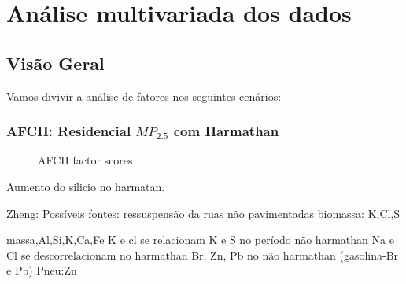 \chapter{Análise multivariada dos dados}

\section{Visão Geral}
Vamos divivir a análise de fatores nos seguintes cenários:



\subsection{AFCH: Residencial $MP_{2.5}$ \textbf{com} Harmathan}

%
%

\begin{figure}[H]
\centering
\caption{AFCH factor scores}
\label{fig:AFCH_factor_scores}
\end{figure}

Aumento do silicio no harmatan.

Zheng: 
Possíveis fontes: ressuspensão da ruas não pavimentadas
biomassa: K,Cl,S

massa,Al,Si,K,Ca,Fe
K e cl se relacionam
K e S no período não harmathan 
Na e Cl se descorrelacionam no harmathan
Br, Zn, Pb no não harmathan (gasolina-Br e Pb) Pneu:Zn


